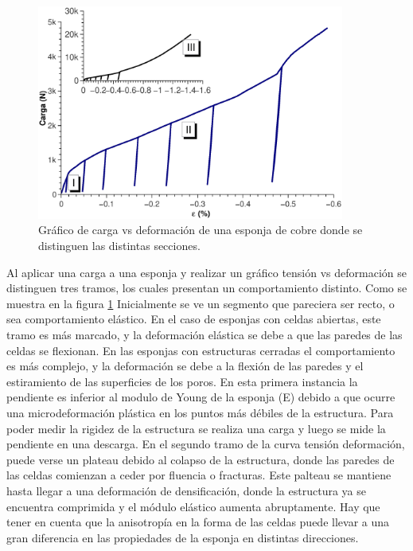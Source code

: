 \documentclass[a4paper,12pt,fleqn,twoside,openany]{book}
\begin{document}
\begin{figure}[h]
 \centering
 \includegraphics[width=0.9\textwidth]{Img/Introduccion/EspCu.eps}
 \caption{Gráfico de carga vs deformación de una esponja de cobre donde se distinguen las distintas secciones.}
 \label{fig:EspCu} 
\end{figure}

Al aplicar una carga a una esponja y realizar un gráfico tensión vs deformación se distinguen tres tramos, los cuales presentan un comportamiento 
distinto. Como se muestra en la figura \ref{fig:EspCu} Inicialmente se ve un segmento que pareciera ser recto, o sea comportamiento elástico. En el caso de esponjas con celdas abiertas, este tramo 
es más marcado, y la deformación elástica se debe a que las paredes de las celdas se flexionan. En las esponjas con estructuras cerradas el 
comportamiento es más complejo, y la deformación se debe a la flexión de las paredes y el estiramiento de las superficies de los poros. En esta primera 
instancia la pendiente es inferior al modulo de Young de la esponja (E) debido a que ocurre una microdeformación plástica en los puntos más débiles de la 
estructura. Para poder medir la rigidez de la estructura se realiza una carga y luego se mide la pendiente en una descarga.
En el segundo tramo de la curva tensión deformación, puede verse un plateau debido al colapso de la estructura, donde las paredes de las celdas 
comienzan a ceder por fluencia o fracturas. Este palteau se mantiene hasta llegar a una deformación de densificación, donde la estructura ya se encuentra 
comprimida y el módulo elástico aumenta abruptamente. Hay que tener en cuenta que la anisotropía en la forma de las celdas puede llevar a una gran diferencia 
en las propiedades de la esponja en distintas direcciones.
\end{document}
